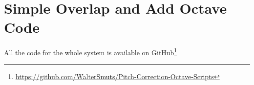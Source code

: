 \documentclass[12pt, twoside, openright]{report}
\newcommand{\octavelisting}[1]{
\begin{center}
\begin{minipage}[c]{\textwidth}

\end{minipage}
\end{center}
}
\begin{document}
\newpage
\section{Simple Overlap and Add Octave Code}
All the code for the whole system is available on
GitHub\footnote{\url{https://github.com/WalterSmuts/Pitch-Correction-Octave-Scripts}}
\octavelisting{getScaledSampleOLA}
\octavelisting{getSamplePointsOLA}
\octavelisting{getSegmentedSample}
\octavelisting{overlapAndAdd}
\end{document}
